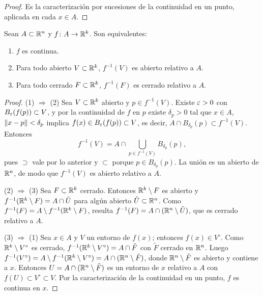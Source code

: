 \begin{proof}
  Es la caracterización por sucesiones de la continuidad en un punto, aplicada en cada \(x \in A\).
\end{proof}

\begin{prop}
  Sean \(A \subset \mathbb{R}^n\) y \(f\colon A \to \mathbb{R}^k\). Son equivalentes:
  \begin{enumerate}[label=(\arabic*)]
    \item \(f\) es continua.
    \item Para todo abierto \(V \subset \mathbb{R}^k\), \(f^{-1}(V)\) es abierto relativo a \(A\).
    \item Para todo cerrado \(F \subset \mathbb{R}^k\), \(f^{-1}(F)\) es cerrado relativo a \(A\).
  \end{enumerate}
\end{prop}

\begin{proof}
  (1) \(\Rightarrow\) (2) Sea \(V \subset \mathbb{R}^k\) abierto y \(p \in f^{-1}(V)\). Existe \(\varepsilon > 0\) con \(B_{\varepsilon}(f(p)) \subset V\), y por la continuidad de \(f\) en \(p\) existe \(\delta_p > 0\) tal que \(x \in A\), \(\left\lVert x - p \right\rVert < \delta_p\) implica \(f(x) \in B_{\varepsilon}(f(p)) \subset V\), es decir, \(A \cap B_{\delta_p}(p) \subset f^{-1}(V)\). Entonces
  \[
    f^{-1}(V) = A \cap \bigcup_{p \in f^{-1}(V)} B_{\delta_p}(p),
  \]
  pues \(\supset\) vale por lo anterior y \(\subset\) porque \(p \in B_{\delta_p}(p)\). La unión es un abierto de \(\mathbb{R}^n\), de modo que \(f^{-1}(V)\) es abierto relativo a \(A\).

  (2) \(\Rightarrow\) (3) Sea \(F \subset \mathbb{R}^k\) cerrado. Entonces \(\mathbb{R}^k \setminus F\) es abierto y \(f^{-1}(\mathbb{R}^k \setminus F) = A \cap \tilde{U}\) para algún abierto \(\tilde{U} \subset \mathbb{R}^n\). Como \(f^{-1}(F) = A \setminus f^{-1}(\mathbb{R}^k \setminus F)\), resulta \(f^{-1}(F) = A \cap (\mathbb{R}^n \setminus \tilde{U})\), que es cerrado relativo a \(A\).

  (3) \(\Rightarrow\) (1) Sea \(x \in A\) y \(V\) un entorno de \(f(x)\); entonces \(f(x) \in V^{\circ}\). Como \(\mathbb{R}^k \setminus V^{\circ}\) es cerrado, \(f^{-1}(\mathbb{R}^k \setminus V^{\circ}) = A \cap \tilde{F}\) con \(\tilde{F}\) cerrado en \(\mathbb{R}^n\). Luego \(f^{-1}(V^{\circ}) = A \setminus f^{-1}(\mathbb{R}^k \setminus V^{\circ}) = A \cap (\mathbb{R}^n \setminus \tilde{F})\), donde \(\mathbb{R}^n \setminus \tilde{F}\) es abierto y contiene a \(x\). Entonces \(U = A \cap (\mathbb{R}^n \setminus \tilde{F})\) es un entorno de \(x\) relativo a \(A\) con \(f(U) \subset V^{\circ} \subset V\). Por la caracterización de la continuidad en un punto, \(f\) es continua en \(x\).
\end{proof}

